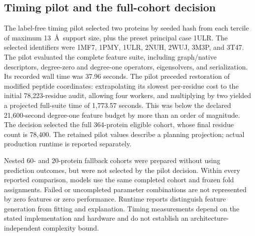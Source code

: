 \subsection{Timing pilot and the full-cohort decision}
\label{sec:compute_details}
The label-free timing pilot selected two proteins by seeded hash from each tercile of maximum 13~\AA\ support size, plus the preset principal case 1ULR. The selected identifiers were 1MF7, 1PMY, 1ULR, 2NUH, 2WUJ, 3M3P, and 3T47. The pilot evaluated the complete feature suite, including graph/native descriptors, degree-zero and degree-one operators, eigensolvers, and serialization. Its recorded wall time was 37.96 seconds. The pilot preceded restoration of modified peptide coordinates: extrapolating its slowest per-residue cost to the initial 78,223-residue audit, allowing four workers, and multiplying by two yielded a projected full-suite time of 1,773.57 seconds. This was below the declared 21,600-second degree-one feature budget by more than an order of magnitude. The decision selected the full 364-protein eligible cohort, whose final residue count is 78,400. The retained pilot values describe a planning projection; actual production runtime is reported separately.

Nested 60- and 20-protein fallback cohorts were prepared without using prediction outcomes, but were not selected by the pilot decision. Within every reported comparison, models use the same completed cohort and frozen fold assignments. Failed or uncompleted parameter combinations are not represented by zero features or zero performance. Runtime reports distinguish feature generation from fitting and explanation. Timing measurements depend on the stated implementation and hardware and do not establish an architecture-independent complexity bound.
